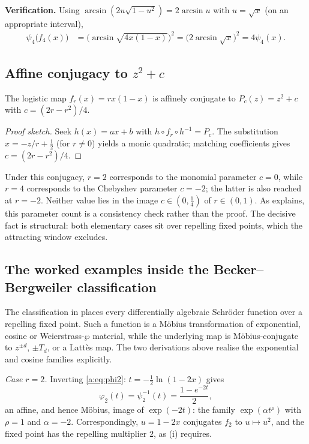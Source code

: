 \textbf{Verification.}
Using $\arcsin(2u\sqrt{1-u^2})=2\arcsin u$ with $u=\sqrt{x}$ (on an appropriate interval),
\begin{align*}
\psi_4\bigl(f_4(x)\bigr)
&=
\bigl(\arcsin\sqrt{4x(1-x)}\bigr)^2
=
\bigl(2\arcsin\sqrt{x}\bigr)^2
=
4\psi_4(x).
\end{align*}

\subsection{Affine conjugacy to \texorpdfstring{$z^2+c$}{z squared plus c}}

\begin{lemma}
\label{a:lem:affine}
The logistic map $f_r(x)=rx(1-x)$ is affinely conjugate to $P_c(z)=z^2+c$ with $c=(2r-r^2)/4$.
\end{lemma}

\begin{proof}[Proof sketch]
Seek $h(x)=ax+b$ with $h\circ f_r\circ h^{-1}=P_c$. The substitution $x=-z/r+\tfrac12$ (for $r\neq0$) yields a monic quadratic; matching coefficients gives $c=(2r-r^2)/4$.
\end{proof}

Under this conjugacy, $r=2$ corresponds to the monomial parameter $c=0$, while
$r=4$ corresponds to the Chebyshev parameter $c=-2$; the latter is also reached
at $r=-2$.  Neither value lies in the image $c\in(0,\tfrac14)$ of $r\in(0,1)$.
As  explains, this parameter count is a consistency check rather
than the proof.  The decisive fact is structural: both elementary cases sit over
repelling fixed points, which the attracting window excludes.

\subsection{The worked examples inside the Becker--Bergweiler classification}

The classification in  places every differentially algebraic
Schr\"oder function over a repelling fixed point.  Such a function is a M\"obius
transformation of exponential, cosine or Weierstrass-$\wp$ material, while the
underlying map is M\"obius-conjugate to $z^{\pm d}$, $\pm T_d$, or a Latt\`es map.
The two derivations above realise the exponential and cosine families explicitly.

\emph{Case $r=2$.} Inverting \eqref{a:eq:phi2}: $t=-\tfrac12\ln(1-2x)$ gives
\[
\varphi_2(t)=\psi_2^{-1}(t)=\frac{1-e^{-2t}}{2},
\]
an affine, and hence M\"obius, image of $\exp(-2t)$: the family
$\exp(\alpha t^{\rho})$ with $\rho=1$ and $\alpha=-2$.  Correspondingly,
$u=1-2x$ conjugates $f_2$ to $u\mapsto u^2$, and the fixed point has the
repelling multiplier $2$, as (i) requires.


